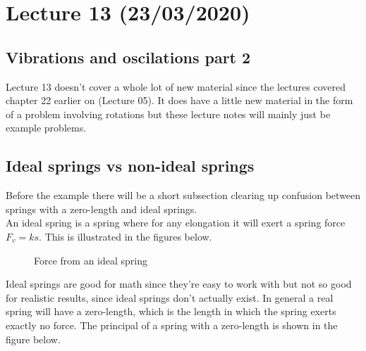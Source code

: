 \documentclass[11pt, a4paper]{article}
\begin{document}
\setcounter{section}{12}

\section{Lecture 13 (23/03/2020)}
\subsection{Vibrations and oscilations part 2}
Lecture 13 doesn't cover a whole lot of new material since the lectures covered chapter 22 earlier on (Lecture 05). It does have a little new material in the form of a problem involving rotations but these lecture notes will mainly just be example problems.

\subsection{Ideal springs vs non-ideal springs}
Before the example there will be a short subsection clearing up confusion between springs with a zero-length and ideal springs.\\
An ideal spring is a spring where for any elongation it will exert a spring force $F_v = ks$. This is illustrated in the figures below.
\begin{figure}[h]
  \centering
  \qquad
  \qquad
  \caption{Force from an ideal spring}
\end{figure}
Ideal springs are good for math since they're easy to work with but not so good for realistic results, since ideal springs don't actually exist. In general a real spring will have a zero-length, which is the length in which the spring exerts exactly no force. The principal of a spring with a zero-length is shown in the figure below.
\end{document}
